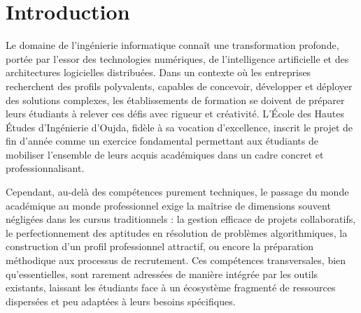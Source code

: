 \documentclass[12pt,a4paper]{report}
\newcommand{\headingfont}{}
\begin{document}
	
	\newpage
	\renewcommand{\listfigurename}{{\headingfont Liste des figures}}
	\listoffigures

	\newpage
	\renewcommand{\contentsname}{{\headingfont Table des matières}}
	\tableofcontents
	\clearpage
	\setcounter{page}{1}
	\chapter*{{\headingfont Introduction}}
	
	Le domaine de l'ingénierie informatique connaît une transformation profonde, portée par l'essor des technologies numériques, de l'intelligence artificielle et des architectures logicielles distribuées. Dans un contexte où les entreprises recherchent des profils polyvalents, capables de concevoir, développer et déployer des solutions complexes, les établissements de formation se doivent de préparer leurs étudiants à relever ces défis avec rigueur et créativité. L'École des Hautes Études d'Ingénierie d'Oujda, fidèle à sa vocation d'excellence, inscrit le projet de fin d'année comme un exercice fondamental permettant aux étudiants de mobiliser l'ensemble de leurs acquis académiques dans un cadre concret et professionnalisant.
	
	Cependant, au-delà des compétences purement techniques, le passage du monde académique au monde professionnel exige la maîtrise de dimensions souvent négligées dans les cursus traditionnels : la gestion efficace de projets collaboratifs, le perfectionnement des aptitudes en résolution de problèmes algorithmiques, la construction d'un profil professionnel attractif, ou encore la préparation méthodique aux processus de recrutement. Ces compétences transversales, bien qu'essentielles, sont rarement adressées de manière intégrée par les outils existants, laissant les étudiants face à un écosystème fragmenté de ressources dispersées et peu adaptées à leurs besoins spécifiques.
	
\end{document}

